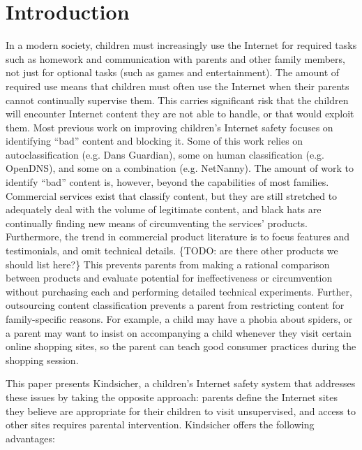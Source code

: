 
\section{Introduction}

In a modern society, children must increasingly use the Internet for required
tasks such as homework and communication with parents and other family
members, not just for optional tasks (such as games and entertainment). 
%
The amount of required use means that children must often use the Internet
when their parents cannot continually supervise them. 
%
This carries significant risk that the children will encounter Internet
content they are not able to handle, or that would exploit them. 
%
Most previous work on improving children's Internet safety focuses on
identifying ``bad'' content and blocking it. Some of this work relies
on autoclassification (e.g. Dans Guardian\cite{dansguardian}), some on
human classification (e.g. OpenDNS\cite{opendns}), and some on a
combination (e.g. NetNanny\cite{netnanny}).
%
The amount of work to identify ``bad'' content is, however, beyond the
capabilities of most families.
%
Commercial services exist that classify content, \cite{opendns}\cite{netnanny}
but they are still stretched to adequately deal with the volume of legitimate
content, and black hats are continually finding new means of circumventing the
services' products.
%
Furthermore, the trend in commercial product literature is to focus
features and testimonials, and omit technical details.\cite{opendns}
\{TODO: are there other products we should list here?\}
%
This prevents parents from making a rational comparison between
products and evaluate potential for ineffectiveness or circumvention
without purchasing each and performing detailed technical experiments.
%
Further, outsourcing content classification prevents a parent from restricting
content for family-specific reasons. 
%
For example, a child may have a phobia about spiders, or a parent may want to
insist on accompanying a child whenever they visit certain online shopping
sites, so the parent can teach good consumer practices during the shopping
session. 

This paper presents Kindsicher, a children's Internet safety system
that addresses these issues by taking the opposite approach: parents
define the Internet sites they believe are appropriate for their
children to visit unsupervised, and access to other sites requires
parental intervention.
%
Kindsicher offers the following advantages:

